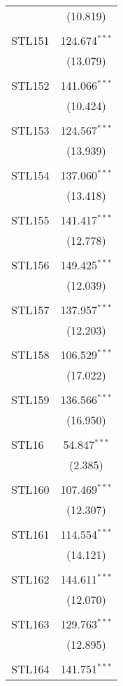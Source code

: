 \begin{table}[!htbp]
\begin{tabular}{@{\extracolsep{5pt}}lc}
  & (10.819) \\ 
  & \\ 
 STL151 & 124.674$^{***}$ \\ 
  & (13.079) \\ 
  & \\ 
 STL152 & 141.066$^{***}$ \\ 
  & (10.424) \\ 
  & \\ 
 STL153 & 124.567$^{***}$ \\ 
  & (13.939) \\ 
  & \\ 
 STL154 & 137.060$^{***}$ \\ 
  & (13.418) \\ 
  & \\ 
 STL155 & 141.417$^{***}$ \\ 
  & (12.778) \\ 
  & \\ 
 STL156 & 149.425$^{***}$ \\ 
  & (12.039) \\ 
  & \\ 
 STL157 & 137.957$^{***}$ \\ 
  & (12.203) \\ 
  & \\ 
 STL158 & 106.529$^{***}$ \\ 
  & (17.022) \\ 
  & \\ 
 STL159 & 136.566$^{***}$ \\ 
  & (16.950) \\ 
  & \\ 
 STL16 & 54.847$^{***}$ \\ 
  & (2.385) \\ 
  & \\ 
 STL160 & 107.469$^{***}$ \\ 
  & (12.307) \\ 
  & \\ 
 STL161 & 114.554$^{***}$ \\ 
  & (14.121) \\ 
  & \\ 
 STL162 & 144.611$^{***}$ \\ 
  & (12.070) \\ 
  & \\ 
 STL163 & 129.763$^{***}$ \\ 
  & (12.895) \\ 
  & \\ 
 STL164 & 141.751$^{***}$ \\ 

\end{tabular}
\end{table}
